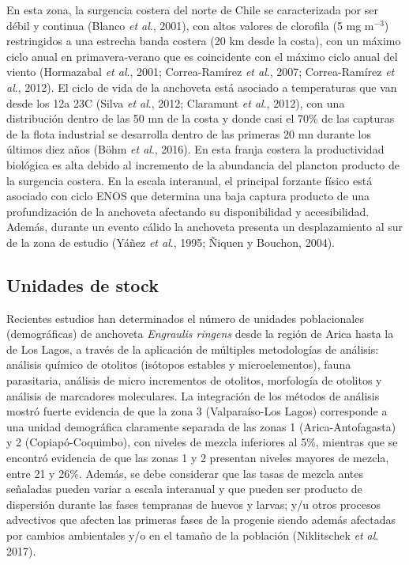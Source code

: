 \documentclass[letter,11pt]{article}
\begin{document}
En esta zona, la surgencia costera del norte de Chile se caracterizada
por ser d\'ebil y continua (Blanco \textit{et al}., 2001), con altos
valores de clorofila (5 mg m$^{-3}$) restringidos a una estrecha banda
costera (20 km desde la costa), con un m\'aximo ciclo anual
en primavera-verano que es coincidente con el m\'aximo ciclo anual del
viento (Hormazabal \textit{et al}., 2001; Correa-Ram\'irez
\textit{et al}., 2007; Correa-Ram\'irez \textit{et al}., 2012). El ciclo
de vida de la anchoveta est\'a asociado a temperaturas que van desde los
12\degree a 23\degree C (Silva \textit{et al}., 2012; Claramunt
\textit{et al}., 2012), con una distribuci\'on dentro de las 50 mn de la
costa y donde casi el 70\% de las capturas de la flota industrial se
desarrolla dentro de las primeras 20 mn durante los \'ultimos diez a\~{n}os
(B\"ohm \textit{et al}., 2016). En esta franja costera la productividad
biol\'ogica es alta debido al incremento de la abundancia del plancton
producto de la surgencia costera. En la escala interanual, el principal
forzante f\'isico est\'a asociado con ciclo ENOS que determina una baja
captura producto de una profundizaci\'on de la anchoveta afectando su
disponibilidad y accesibilidad. Adem\'as, durante un evento c\'alido la
anchoveta presenta un desplazamiento al sur de la zona de estudio (Y\'a\~{n}ez
\textit{et al}., 1995; \~{N}iquen y Bouchon, 2004).


\subsection{Unidades de stock}

Recientes estudios han determinados el n\'umero de unidades poblacionales
(demogr\'aficas) de anchoveta \textit{Engraulis ringens} desde la regi\'on
de Arica hasta la de Los Lagos, a trav\'es de la aplicaci\'on de m\'ultiples
metodolog\'ias de an\'alisis: an\'alisis qu\'imico de otolitos (is\'otopos
estables y microelementos), fauna parasitaria, an\'alisis de micro
incrementos de otolitos, morfolog\'ia de otolitos y an\'alisis de marcadores
moleculares. La integraci\'on de los m\'etodos de an\'alisis mostr\'o fuerte
evidencia de que la zona 3 (Valpara\'iso-Los Lagos) corresponde a una
unidad demogr\'afica claramente separada de las zonas 1
(Arica-Antofagasta) y 2 (Copiap\'o-Coquimbo), con niveles de mezcla
inferiores al 5\%, mientras que se encontr\'o evidencia de que las zonas 1
y 2 presentan niveles mayores de mezcla, entre 21 y 26\%. Adem\'as, se
debe considerar que las tasas de mezcla antes se\~{n}aladas pueden variar a
escala interanual y que pueden ser producto de dispersi\'on durante las
fases tempranas de huevos y larvas; y/u otros procesos advectivos que
afecten las primeras fases de la progenie siendo adem\'as afectadas por
cambios ambientales y/o en el tama\~{n}o de la poblaci\'on (Niklitschek
\textit{et al}. 2017).
\end{document}
